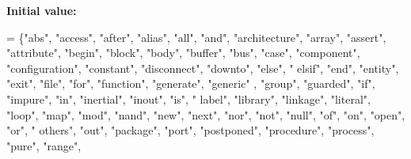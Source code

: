 {\bfseries Initial value\+:}
\begin{DoxyCode}
= \{\textcolor{stringliteral}{"abs"},           \textcolor{stringliteral}{"access"},   \textcolor{stringliteral}{"after"},      \textcolor{stringliteral}{"alias"},  \textcolor{stringliteral}{"all"},      \textcolor{stringliteral}{"and"},      \textcolor{stringliteral}{"architecture"}, \textcolor{stringliteral}{"array"},   \textcolor{stringliteral}{
      "assert"},  \textcolor{stringliteral}{"attribute"}, \textcolor{stringliteral}{"begin"},     \textcolor{stringliteral}{"block"},    \textcolor{stringliteral}{"body"},     \textcolor{stringliteral}{"buffer"},  \textcolor{stringliteral}{"bus"},    \textcolor{stringliteral}{"case"},      \textcolor{stringliteral}{"component"},
                                         \textcolor{stringliteral}{"configuration"}, \textcolor{stringliteral}{"constant"}, \textcolor{stringliteral}{"disconnect"}, \textcolor{stringliteral}{"downto"}, \textcolor{stringliteral}{"else"},     \textcolor{stringliteral}{"
      elsif"},    \textcolor{stringliteral}{"end"},          \textcolor{stringliteral}{"entity"},  \textcolor{stringliteral}{"exit"},    \textcolor{stringliteral}{"file"},      \textcolor{stringliteral}{"for"},       \textcolor{stringliteral}{"function"}, \textcolor{stringliteral}{"generate"}, \textcolor{stringliteral}{"generic"}
      , \textcolor{stringliteral}{"group"},  \textcolor{stringliteral}{"guarded"},   \textcolor{stringliteral}{"if"},
                                         \textcolor{stringliteral}{"impure"},        \textcolor{stringliteral}{"in"},       \textcolor{stringliteral}{"inertial"},   \textcolor{stringliteral}{"inout"},  \textcolor{stringliteral}{"is"},       \textcolor{stringliteral}{"
      label"},    \textcolor{stringliteral}{"library"},      \textcolor{stringliteral}{"linkage"}, \textcolor{stringliteral}{"literal"}, \textcolor{stringliteral}{"loop"},      \textcolor{stringliteral}{"map"},       \textcolor{stringliteral}{"mod"},      \textcolor{stringliteral}{"nand"},     \textcolor{stringliteral}{"new"},   
        \textcolor{stringliteral}{"next"},   \textcolor{stringliteral}{"nor"},       \textcolor{stringliteral}{"not"},
                                         \textcolor{stringliteral}{"null"},          \textcolor{stringliteral}{"of"},       \textcolor{stringliteral}{"on"},         \textcolor{stringliteral}{"open"},   \textcolor{stringliteral}{"or"},       \textcolor{stringliteral}{"
      others"},   \textcolor{stringliteral}{"out"},          \textcolor{stringliteral}{"package"}, \textcolor{stringliteral}{"port"},    \textcolor{stringliteral}{"postponed"}, \textcolor{stringliteral}{"procedure"}, \textcolor{stringliteral}{"process"},  \textcolor{stringliteral}{"pure"},     \textcolor{stringliteral}{"range"}, 

\end{DoxyCode}
